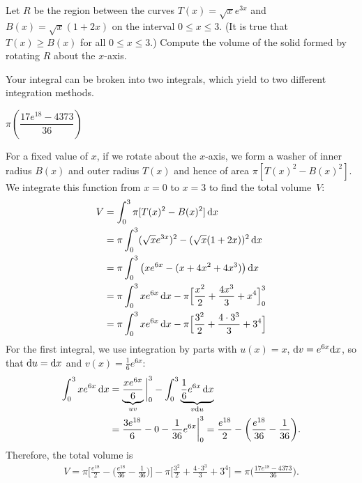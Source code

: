 \begin{question}[2016Q3] %
Let $R$ be the region between the curves $T(x) = \sqrt{x}e^{3x}$ and $B(x) = \sqrt{x}(1+2x)$ on the interval $0 \le x \le 3$. (It is true that $T(x)\ge B(x)$ for all $0\le x\le 3$.) Compute the volume of the solid formed by rotating $R$ about the $x$-axis.
\end{question}

\begin{hint}
Your integral can be broken into two integrals, which yield to two different integration methods.
\end{hint}

\begin{answer}
$ \pi \left( \dfrac{17 e^{18}-4373}{36} \right)$
\end{answer}

\begin{solution}
For a fixed value of $x$, if we rotate about the $x$-axis, we form a washer of
inner radius $B(x)$ and outer radius $T(x)$ and hence of area $\pi [T(x)^2 - B(x)^2]$.
We integrate this function from $x=0$ to $x=3$ to find the total volume~$V$:
\begin{align*}
V &= \int_0^3 \pi [T(x)^2 - B(x)^2]\,\mathrm{d}x \\
&= \pi \int_0^3 (\sqrt{x}e^{3x})^2 - (\sqrt{x}(1+2x))^2 \,\mathrm{d}x \\
&= \pi \int_0^3  \big( xe^{6x} - (x+4x^2+4x^3) \big) \,\mathrm{d}x \\
&=  \pi \int_0^3 xe^{6x} \,\mathrm{d}x
       - \pi  \Big[ \frac{x^2}{2} + \frac{4x^3}{3} + x^4\Big]_{0}^3 \\
&= \pi \int_0^3 xe^{6x} \,\mathrm{d}x - \pi \Big[\frac{3^2}{2} + \frac{4\cdot3^3}{3} + 3^4\Big]
\end{align*}
For the first integral, we use integration by parts with $u(x) = x$, $\mathrm{d}v = e^{6x}\mathrm{d}x$,
so that $\mathrm{d}u=\mathrm{d}x$ and $v(x)=\frac16e^{6x}$:
\begin{align*}
\int_0^3 xe^{6x} \,\mathrm{d}x
&=\underbrace{ \frac{xe^{6x}}{6}}_{uv}\bigg|_{0}^3 - \int_0^3 \underbrace{\frac{1}{6}e^{6x} \,\mathrm{d}x }_{v\mathrm{d}u}\\
&= \frac{3e^{18}}{6} - 0 - \frac{1}{36} e^{6x} \bigg|_{0}^3
= \frac{e^{18}}{2} - \bigg( \frac{e^{18}}{36} - \frac1{36} \bigg).
\end{align*}
Therefore, the total volume is
\begin{align*}
  V = \pi \bigg[\frac{e^{18}}{2} - \bigg( \frac{e^{18}}{36} - \frac1{36} \bigg) \bigg]
               - \pi \bigg[\frac{3^2}{2} + \frac{4\cdot3^3}{3} + 3^4 \bigg]
    = \pi \bigg( \frac{17 e^{18}-4373}{36} \bigg).
\end{align*}
\end{solution}

